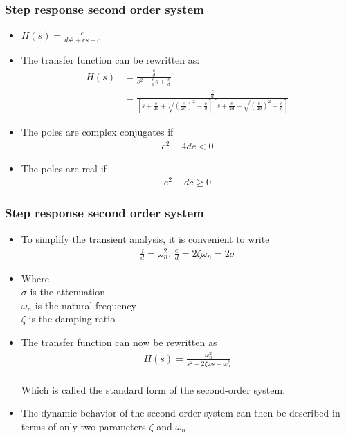 \begin{frame}
\frametitle{Step response second order system}
\begin{itemize}
\item $H(s) = \frac{c}{ds^2+es+c}$
\vspace{0.45cm}
\item The transfer function can be rewritten as:
\\ 
\begin{align*}
H(s) &= \frac{\frac{c}{d}}{s^2+\frac{e}{d}s+\frac{c}{d}}
\\ &= \frac{\frac{c}{d}}{[s+\frac{e}{2d}+\sqrt{(\frac{e}{2d})^2-\frac{c}{d}}][s+\frac{e}{2d}-\sqrt{(\frac{e}{2d})^2-\frac{c}{d}}]}
\end{align*}
\item The poles are complex conjugates if
\\ \vspace{-0.15cm}
\begin{align*}
e^2 -4dc <0
\end{align*}
\item The poles are real if
\\
\begin{align*}
e^2 -dc\ge 0
\end{align*}
\end{itemize}
\end{frame}

\begin{frame}
\frametitle{Step response second order system}
\begin{itemize}
\item To simplify the transient analysis, it is convenient to write
\\ 
\begin{align*}
\frac{f}{d} = \omega_n ^2\text{, } \frac{e}{d}=2\zeta\omega_n=2\sigma
\end{align*}
\item Where 
\\ $\sigma$ is the attenuation 
\\$\omega_n$ is the natural frequency 
\\ $\zeta$ is the damping ratio
\vspace{0.25cm}
\item The transfer function can now be rewritten as
\\ \vspace{-0.5cm}
\begin{align*}
H(s) = \frac{\omega_n ^2}{s^2+2\zeta\omega s +\omega_n ^2}
\end{align*}
\\ Which is called the standard form of the second-order system.
\vspace{0.25cm}
\item The dynamic behavior of the second-order system can then be described in terms of only two parameters $\zeta$ and $\omega_n$
\end{itemize} 
\end{frame}

